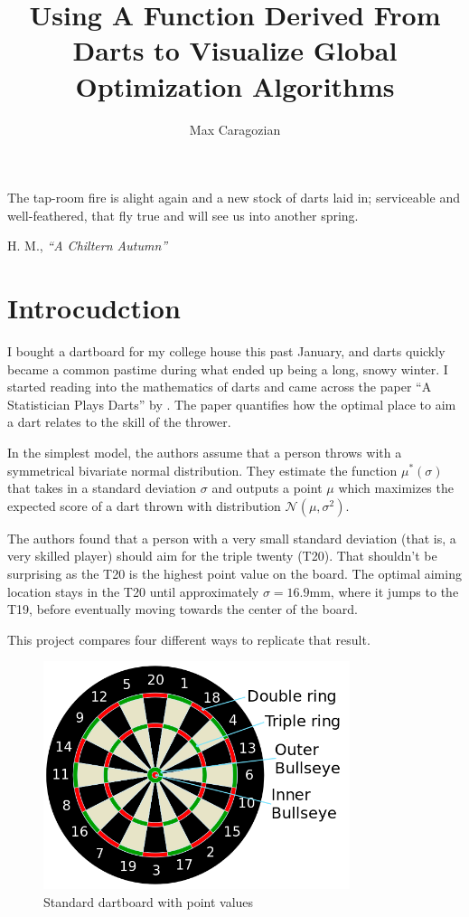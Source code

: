 \documentclass[]{article}
\title{Using A Function Derived From Darts to Visualize Global Optimization Algorithms}
\author{Max Caragozian}
\begin{document}
\maketitle


\epigraph{The tap-room fire is alight again and a new stock of darts laid in; serviceable and well-feathered, that fly true and will see us into another spring.}{H. M., \emph{``A Chiltern Autumn''} \cite{1929spectator}}

\section{Introcudction}
I bought a dartboard for my college house this past January, and darts quickly became a common pastime during what ended up being a long, snowy winter. I started reading into the mathematics of darts and came across the paper ``A Statistician Plays Darts\cite{stat}'' by \citeauthor{stat}. The paper quantifies how the optimal place to aim a dart relates to the skill of the thrower.

In the simplest model, the authors assume that a person throws with a symmetrical bivariate normal distribution. They estimate the function $\mu^*(\sigma)$ that takes in a standard deviation $\sigma$ and outputs a point $\mu$ which maximizes the expected score of a dart thrown with distribution $\mathcal{N}(\mu, \sigma^2)$.

The authors found that a person with a very small standard deviation (that is, a very skilled player) should aim for the triple twenty (T20). That shouldn't be surprising as the T20 is the highest point value on the board. The optimal aiming location stays in the T20 until approximately $\sigma=16.9$mm, where it jumps to the T19, before eventually moving towards the center of the board.

This project compares four different ways to replicate that result.

\begin{figure}
	\centering
	\includegraphics[width=0.8\textwidth]{../images/dartboard_diagram.png}
	\caption{Standard dartboard with point values \cite{diag}}
	\label{fig:diag}
\end{figure}
\end{document}
